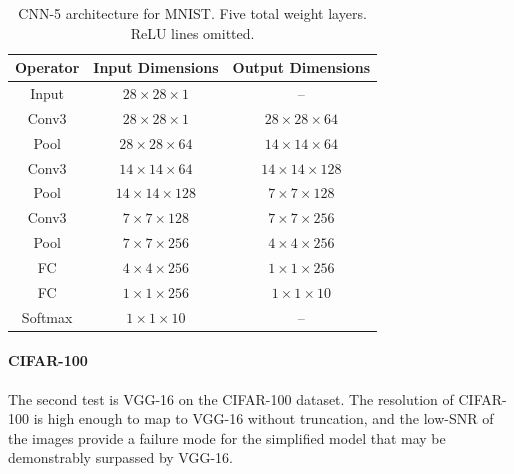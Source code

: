 \documentclass[10pt, a4paper]{article}
\begin{document}
\begin{table}[H]
\centering
\small
\renewcommand{\arraystretch}{0.8}
\begin{tabular}{|c|c|c|}
	\hline
	\textbf{Operator} & \textbf{Input Dimensions} & \textbf{Output Dimensions}\\
    \hline
    Input & $28\times28\times1$&-- \\
    \hline
    Conv3 & $28\times28\times1$ &$28\times28\times64$ \\
    \hline
    Pool & $28\times28\times64$ & $14\times14\times64$ \\
    \hline

    Conv3 & $14\times14\times64$ & $14\times14\times128$ \\
    \hline
    Pool & $14\times14\times128$ & $7\times7\times128$ \\
    \hline

    Conv3 & $7\times7\times128$ & $7\times7\times256$ \\
    \hline
    Pool & $7\times7\times256$ & $4\times4\times256$ \\
    \hline

    FC & $4\times4\times256$ & $1\times1\times256$ \\
    \hline
    FC & $1\times1\times256$ & $1\times1\times10$ \\
    \hline
    Softmax & $1\times1\times10$&--\\
    \hline
\end{tabular}
\caption{CNN-5 architecture for MNIST. Five total weight layers. ReLU lines omitted.}
\end{table}

\paragraph{CIFAR-100} The second test is VGG-16 on the CIFAR-100 dataset. The resolution of CIFAR-100 is high enough to map to VGG-16 without truncation, and the low-SNR of the images provide a failure mode for the simplified model that may be demonstrably surpassed by VGG-16.
\end{document}
